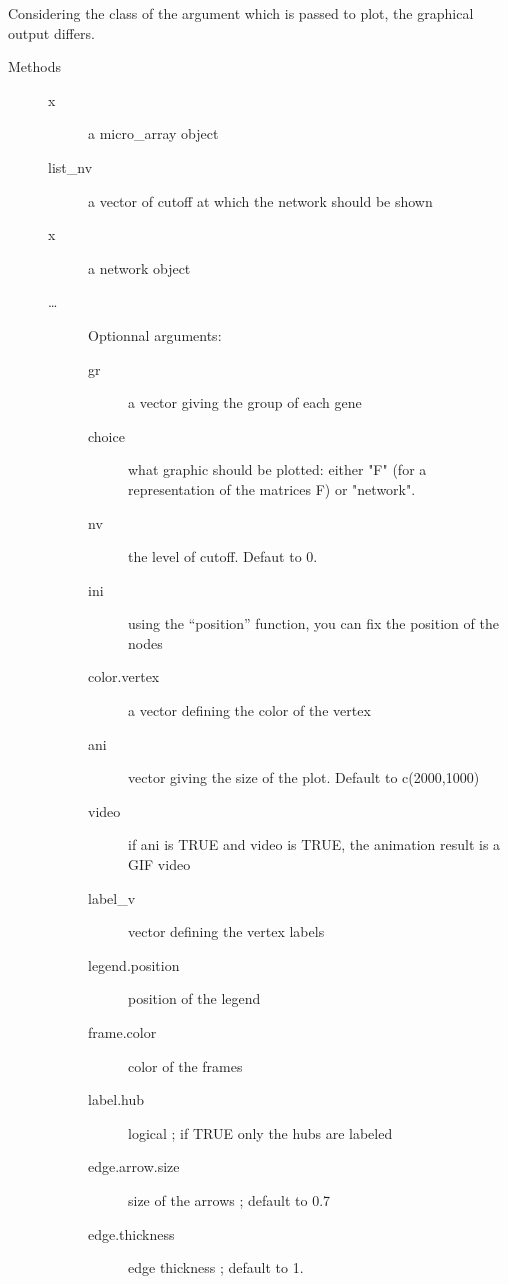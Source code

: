 \documentclass[a4paper]{book}
\begin{document}
%
\begin{Description}\relax
Considering the class of the argument which is passed to plot, the graphical output differs. 
\end{Description}
%
\begin{Section}{Methods}
\begin{description}


\item[] 
\begin{description}

\item[x] a micro\bsl{}\_array object
\item[list\_nv] a vector of cutoff at which the network should be shown

\end{description}

                       
\item[] 
\begin{description}

\item[x] a network object
\item[\dots] Optionnal arguments:
\begin{description}
 \item[gr] a vector giving the group of each gene
\item[choice] what graphic should be plotted: either "F" (for a representation of the matrices F) or "network".
\item[nv] the level of cutoff. Defaut to 0.
\item[ini] using the ``position'' function, you can fix the position of the nodes
\item[color.vertex] a vector defining the color of the vertex
\item[ani] vector giving the size of the plot. Default to c(2000,1000)
\item[video] if ani is TRUE and video is TRUE, the animation result is a GIF video
\item[label\_v] vector defining the vertex labels
\item[legend.position] position of the legend
\item[frame.color] color of the frames
\item[label.hub] logical ; if TRUE only the hubs are labeled                                    
\item[edge.arrow.size] size of the arrows ; default to 0.7
\item[edge.thickness] edge thickness ; default to 1.  


\end{description}
\end{description}
\end{description}
\end{Section}
\end{document}
